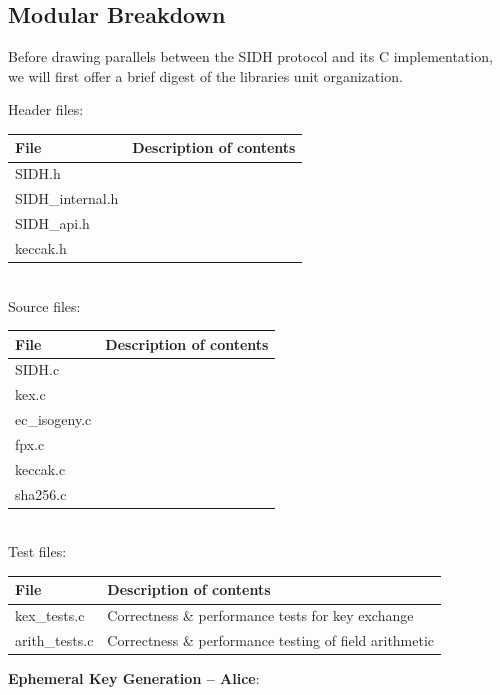\subsection{Modular Breakdown}

	Before drawing parallels between the SIDH protocol and its C implementation, we will first offer a brief digest of the libraries unit organization.\\

\begin{center}
Header files:\\
	\begin{tabular}{@{}ll@{}}
		File & Description of contents\\
		\toprule
		SIDH.h & \\
		\midrule
		SIDH\_internal.h & \\
		\midrule
		SIDH\_api.h & \\
		\midrule
		keccak.h & \\
		\bottomrule
	\end{tabular}\\
	
Source files:\\
	\begin{tabular}{@{}ll@{}}
		File & Description of contents\\
		\toprule
		SIDH.c & \\
		\midrule
		kex.c & \\
		\midrule
		ec\_isogeny.c & \\
		\midrule
		fpx.c & \\
		\midrule
		keccak.c & \\
		\midrule
		sha256.c & \\
		\bottomrule
	\end{tabular}\\
	
Test files:\\
	\begin{tabular}{@{}ll@{}}
		File & Description of contents\\
		\toprule
		kex\_tests.c & Correctness \& performance tests for key exchange\\
		\midrule
		arith\_tests.c & Correctness \& performance testing of field arithmetic\\
		\bottomrule
	\end{tabular}
\end{center}

\textbf{Ephemeral Key Generation -- Alice}:

